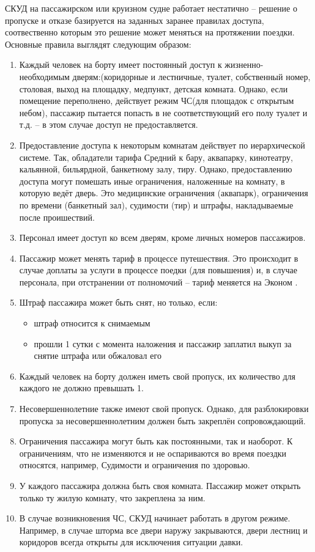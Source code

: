 СКУД на пассажирском или круизном судне работает нестатично -- решение о пропуске и отказе базируется на заданных заранее правилах доступа, соотвественно которым это решение может меняться на протяжении поездки. Основные правила выглядят следующим образом:
\begin{enumerate}
	\item Каждый человек на борту имеет постоянный доступ к жизненно-необходимым дверям:(коридорные и лестничные, туалет, собственный номер, столовая, выход на площадку, медпункт, детская комната.
	Однако, если помещение переполнено, действует режим ЧС(для площадок с открытым небом), пассажир пытается попасть в не соответствующий его полу туалет и т.д. -- в этом случае доступ не предоставляется.
	\item Предоставление доступа к некоторым комнатам действует по иерархической системе. Так, обладатели тарифа \textquotedbl Средний \textquotedbl к бару, аквапарку, кинотеатру, кальянной, бильярдной, банкетному залу, тиру.
	Однако, предоставлению доступа могут помешать иные ограничения, наложенные на комнату, в которую ведёт дверь. Это медицинские ограничения (аквапарк), ограничения по времени (банкетный зал), судимости (тир) и штрафы, накладываемые после проишествий.
	\item Персонал имеет доступ ко всем дверям, кроме личных номеров пассажиров.
	\item Пассажир может менять тариф в процессе путешествия. Это происходит в случае доплаты за услуги в процессе поедки (для повышения) и, в случае персонала, при отстранении от полномочий -- тариф меняется на \textquotedbl Эконом \textquotedbl.
	\item Штраф пассажира может быть снят, но только, если:
	\begin{itemize}
		\item штраф относится к снимаемым
		\item прошли 1 сутки с момента наложения и пассажир заплатил выкуп за снятие штрафа или обжаловал его
	\end{itemize}
	\item Каждый человек на борту должен иметь свой пропуск, их количество для каждого не должно превышать 1.
	\item Несовершеннолетние также имеют свой пропуск.
	Однако, для разблокировки пропуска за несовершеннолетним должен быть закреплён сопровождающий.
	\item Ограничения пассажира могут быть как постоянными, так и наоборот. К ограничениям, что не изменяются и не оспариваются во время поездки относятся, например, Судимости и ограничения по здоровью.
	\item У каждого пассажира должна быть своя комната. Пассажир может открыть только ту жилую комнату, что закреплена за ним.
	\item В случае возникновения ЧС, СКУД начинает работать в другом режиме.
	Например, в случае шторма все двери наружу закрываются, двери лестниц и коридоров всегда открыты для исключения ситуации давки.
\end{enumerate}  